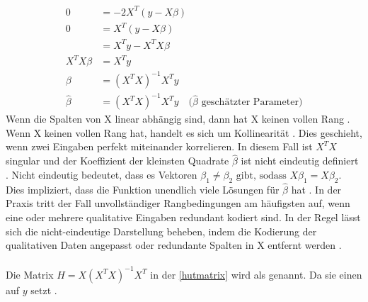 \begin{equation}
\begin{aligned}
0 &= -2 X^T (y - X\beta) \quad  \\
0 &= X^T (y - X\beta) \quad  \\
  &= X^T y - X^T X \beta \\
X^T X \beta &= X^T y \\
\beta &= (X^T X)^{-1} X^T y \\
\hat{\beta} &= (X^T X)^{-1} X^T y \quad \text{($\hat{\beta}$ geschätzter Parameter)}
\end{aligned}
\label{XTXderived}
\end{equation}
Wenn die Spalten von X linear abhängig sind, dann hat X keinen vollen Rang \cite{hastie2009elements}. Wenn X keinen vollen Rang hat, handelt es sich um Kollinearität \cite{Maronna2019Robust}. Dies geschieht, wenn zwei Eingaben perfekt miteinander korrelieren. In diesem Fall ist \(X^TX\) singular und der Koeffizient der kleinsten Quadrate $\hat{\beta}$ ist nicht eindeutig definiert \cite{hastie2009elements}. Nicht eindeutig bedeutet, dass es Vektoren \(\beta_1 \neq \beta_2 \text{ gibt, sodass } X\beta_1 = X\beta_2\). Dies impliziert, dass die Funktion unendlich viele Lösungen für $\hat{\beta}$ hat \cite{Maronna2019Robust}. In der Praxis tritt der Fall unvollständiger Rangbedingungen am häufigsten auf, wenn eine oder mehrere qualitative Eingaben redundant kodiert sind. In der Regel lässt sich die nicht-eindeutige Darstellung beheben, indem die Kodierung der qualitativen Daten angepasst oder redundante Spalten in X entfernt werden \cite{hastie2009elements}. \\\\
Die Matrix \( H = X (X^T X)^{-1} X^T \) in der \autoref{hutmatrix} wird als  genannt. Da sie einen  auf \(y\) setzt \cite{huber1981robust}. 

